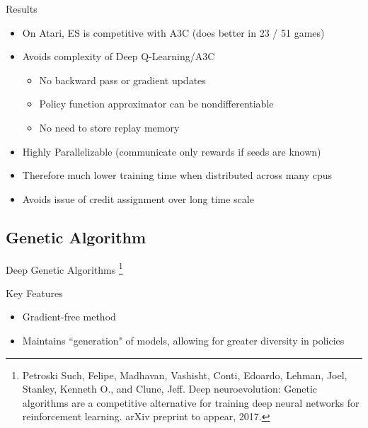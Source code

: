 \documentclass{beamer}
\begin{document}
	\begin{frame}{Results}
		\begin{itemize}
			\item On Atari, ES is competitive with A3C (does better in 23 / 51 games)
			\item Avoids complexity of Deep Q-Learning/A3C
			\begin{itemize}
				\item No backward pass or gradient updates
				\item Policy function approximator can be nondifferentiable
				\item No need to store replay memory
			\end{itemize}
			\item Highly Parallelizable (communicate only rewards if seeds are known)
			\item Therefore much lower training time when distributed across many cpus
			\item Avoids issue of credit assignment over long time scale
		\end{itemize}
	\end{frame}
	
	\subsection*{Genetic Algorithm}

	\begin{frame}
		\Huge Deep Genetic Algorithms
		\footnote{Petroski Such, Felipe, Madhavan, Vashisht, Conti,
Edoardo, Lehman, Joel, Stanley, Kenneth O., and Clune,
Jeff. Deep neuroevolution: Genetic algorithms are a
competitive alternative for training deep neural networks
for reinforcement learning. arXiv preprint to appear,
2017.}
	\end{frame}
	
	\begin{frame}{Key Features}
		\begin{itemize}
			\item Gradient-free method
			\item Maintains ``generation" of models, allowing for greater diversity in policies
		\end{itemize}
	\end{frame}
	
\end{document}
